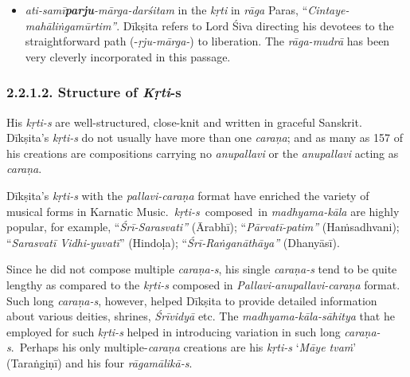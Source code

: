 \begin{itemize}
 \item \textit{ati-samī\textbf{parju}-mārga-darśitam} in the \textit{kṛti} in \textit{rāga} Paras, “\textit{Cintaye-mahāliṅgamūrtim”}. Dīkṣita refers to Lord Śiva directing his devotees to the straightforward path (-\textit{ṛju-mārga-}) to liberation. The \textit{rāga-mudrā} has been very cleverly incorporated in this passage.

\end{itemize}


\subsubsection*{2.2.1.2. Structure of \textit{Kṛti}-s}

His \textit{kṛti-s} are well-structured, close-knit and written in graceful Sanskrit. Dīkṣita’s \textit{kṛti-s} do not usually have more than one \textit{caraṇa}; and as many as 157 of his creations are compositions carrying no \textit{anupallavi} or the \textit{anupallavi} acting as \textit{caraṇa}.

Dīkṣita’s \textit{kṛti-s} with the \textit{pallavi-caraṇa} format have enriched the variety of musical forms in Karnatic Music.~\textit{kṛti-s}~composed~in \textit{madhyama-kāla} are highly popular, for example, “\textit{Śrī-Sarasvati”} (Ārabhī); “\textit{Pārvatī-patim”} (Haṁsadhvani); “\textit{Sarasvatī Vidhi-yuvatī}” (Hindoḷa); “\textit{Śrī-Raṅganāthāya”} (Dhanyāsī).

Since he did not compose multiple \textit{caraṇa-s}, his single \textit{caraṇa-s} tend to be quite lengthy as compared to the \textit{kṛti-s} composed in \textit{Pallavi-anupallavi-caraṇa} format. Such long \textit{caraṇa-s}, however, helped Dīkṣita to provide detailed information about various deities, shrines, \textit{Śrīvidyā} etc. The \textit{madhyama-kāla-sāhitya} that he employed for such \textit{kṛti-s} helped in introducing variation in such long \textit{caraṇa-s}.~Perhaps his only multiple-\textit{caraṇa} creations are his \textit{kṛti-s} ‘\textit{Māye tvaṁ}’ (Taraṅgiṇī) and his four \textit{rāgamālikā-s}.

